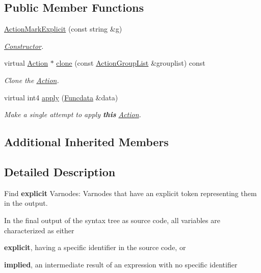 \subsection*{Public Member Functions}
\begin{DoxyCompactItemize}
\item 
\mbox{\hyperlink{class_action_mark_explicit_a731311c495d412cd5eccee301baea2ba}{Action\+Mark\+Explicit}} (const string \&g)
\begin{DoxyCompactList}\small\item\em \mbox{\hyperlink{class_constructor}{Constructor}}. \end{DoxyCompactList}\item 
virtual \mbox{\hyperlink{class_action}{Action}} $\ast$ \mbox{\hyperlink{class_action_mark_explicit_a35862d8fd674fcf340ccf3bdd99a18e6}{clone}} (const \mbox{\hyperlink{class_action_group_list}{Action\+Group\+List}} \&grouplist) const
\begin{DoxyCompactList}\small\item\em Clone the \mbox{\hyperlink{class_action}{Action}}. \end{DoxyCompactList}\item 
virtual int4 \mbox{\hyperlink{class_action_mark_explicit_aea3570d9fb0a90407480fd25cb077f70}{apply}} (\mbox{\hyperlink{class_funcdata}{Funcdata}} \&data)
\begin{DoxyCompactList}\small\item\em Make a single attempt to apply {\bfseries{this}} \mbox{\hyperlink{class_action}{Action}}. \end{DoxyCompactList}\end{DoxyCompactItemize}
\subsection*{Additional Inherited Members}


\subsection{Detailed Description}
Find {\bfseries{explicit}} Varnodes\+: Varnodes that have an explicit token representing them in the output. 

In the final output of the syntax tree as source code, all variables are characterized as either
\begin{DoxyItemize}
\item {\bfseries{explicit}}, having a specific identifier in the source code, or
\item {\bfseries{implied}}, an intermediate result of an expression with no specific identifier
\end{DoxyItemize}

